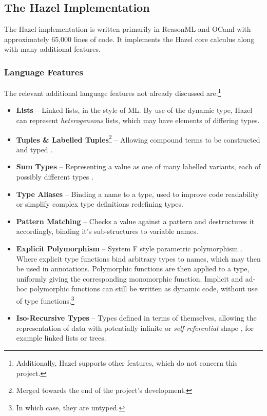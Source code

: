 \subsection{The Hazel Implementation}\label{sec:HazelImplementation}
The Hazel implementation \cite{HazelCode} is written primarily in ReasonML and OCaml with approximately 65,000 lines of code. It implements the Hazel core calculus along with many additional features. 

\subsubsection{Language Features}\label{sec:HazelAdditionalFeatures}
The relevant additional language features not already discussed are:\footnote{Additionally, Hazel supports other features, which do not concern this project.}
\begin{itemize}
\item \textbf{Lists} -- Linked lists, in the style of ML. By use of the dynamic type, Hazel can represent \textit{heterogeneous} lists, which may have elements of differing types.  
\item \textbf{Tuples \& Labelled Tuples}\footnote{Merged towards the end of the project's development.} -- Allowing compound terms to be constructed and typed \cite[ch. 11.7-8]{TAPL}.
\item \textbf{Sum Types} -- Representing a value as one of many labelled variants, each of possibly different types \cite[ch. 11.10]{TAPL}.
\item \textbf{Type Aliases} -- Binding a name to a type, used to improve code readability or simplify complex type definitions redefining types.
\item \textbf{Pattern Matching} -- Checks a value against a pattern and destructures it accordingly, binding it's sub-structures to variable names.
\item \textbf{Explicit Polymorphism} -- System F style parametric polymorphism \cite[ch. 23]{TAPL}. Where explicit type functions bind arbitrary types to names, which may then be used in annotations. Polymorphic functions are then applied to a type, uniformly giving the corresponding monomorphic function. Implicit and ad-hoc polymorphic functions can still be written as dynamic code, without use of type functions.\footnote{In which case, they are untyped.}
\item \textbf{Iso-Recursive Types} -- Types defined in terms of themselves, allowing the representation of data with potentially infinite or \textit{self-referential} shape \cite[ch. 22-23]{TAPL}, for example linked lists or trees.
\end{itemize}

